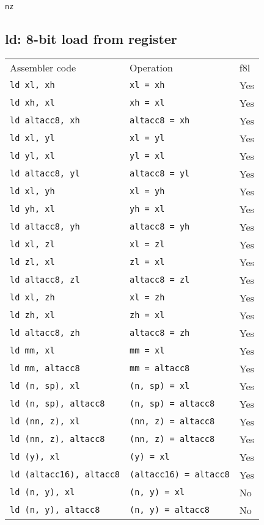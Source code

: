 \documentclass{book}
\begin{document}
\texttt{nz}


\subsection{ld: 8-bit load from register}

\begin{tabular}{l l l}
Assembler code                  & Operation                     & f8l \\
\texttt{ld xl, xh}              & \texttt{xl = xh}              & Yes \\
\texttt{ld xh, xl}              & \texttt{xh = xl}              & Yes \\
\texttt{ld altacc8, xh}         & \texttt{altacc8 = xh}         & Yes \\
\texttt{ld xl, yl}              & \texttt{xl = yl}              & Yes \\
\texttt{ld yl, xl}              & \texttt{yl = xl}              & Yes \\
\texttt{ld altacc8, yl}         & \texttt{altacc8 = yl}         & Yes \\
\texttt{ld xl, yh}              & \texttt{xl = yh}              & Yes \\
\texttt{ld yh, xl}              & \texttt{yh = xl}              & Yes \\
\texttt{ld altacc8, yh}         & \texttt{altacc8 = yh}         & Yes \\
\texttt{ld xl, zl}              & \texttt{xl = zl}              & Yes \\
\texttt{ld zl, xl}              & \texttt{zl = xl}              & Yes \\
\texttt{ld altacc8, zl}         & \texttt{altacc8 = zl}         & Yes \\
\texttt{ld xl, zh}              & \texttt{xl = zh}              & Yes \\
\texttt{ld zh, xl}              & \texttt{zh = xl}              & Yes \\
\texttt{ld altacc8, zh}         & \texttt{altacc8 = zh}         & Yes \\
\texttt{ld mm, xl}              & \texttt{mm = xl}              & Yes \\
\texttt{ld mm, altacc8}         & \texttt{mm = altacc8}         & Yes \\
\texttt{ld (n, sp), xl}         & \texttt{(n, sp) = xl}         & Yes \\
\texttt{ld (n, sp), altacc8}    & \texttt{(n, sp) = altacc8}    & Yes \\
\texttt{ld (nn, z), xl}         & \texttt{(nn, z) = altacc8}    & Yes \\
\texttt{ld (nn, z), altacc8}    & \texttt{(nn, z) = altacc8}    & Yes \\
\texttt{ld (y), xl}             & \texttt{(y) = xl}             & Yes \\
\texttt{ld (altacc16), altacc8} & \texttt{(altacc16) = altacc8} & Yes \\
\texttt{ld (n, y), xl}          & \texttt{(n, y) = xl}          & No \\
\texttt{ld (n, y), altacc8}     & \texttt{(n, y) = altacc8}     & No \\
\end{tabular}
\end{document}
